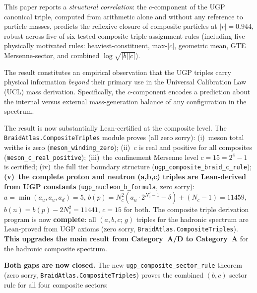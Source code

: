 \documentclass[12pt,a4paper]{article}
\begin{document}
This paper reports a \emph{structural correlation}: the $c$-component of
the UGP canonical triple, computed from arithmetic alone and without any
reference to particle masses, predicts the reflexive closure of composite
particles at $|r| = 0.944$, robust across five of six tested
composite-triple assignment rules (including five physically motivated rules:
heaviest-constituent, max-$|c|$, geometric mean, GTE Mersenne-sector, and combined $\log\sqrt{|b||c|}$).

The result constitutes an empirical observation that the UGP triples carry
physical information \emph{beyond} their primary use in the Universal
Calibration Law (UCL) mass derivation.
Specifically, the $c$-component encodes a prediction about the internal
versus external mass-generation balance of any configuration in the spectrum.

The result is now substantially Lean-certified at the composite level.
The \texttt{BraidAtlas.CompositeTriples} module proves (all zero sorry):
(i)~meson total writhe is zero (\texttt{meson\_winding\_zero});
(ii)~$c$ is real and positive for all composites (\texttt{meson\_c\_real\_positive});
(iii)~the confinement Mersenne level $c = 15 = 2^4-1$ is certified;
(iv)~the full tier boundary structure (\texttt{ugp\_composite\_braid\_c\_rule});
\textbf{(v)~the complete proton and neutron (a,b,c) triples are Lean-derived from
UGP constants} (\texttt{ugp\_nucleon\_b\_formula}, zero sorry): 
$a=\min(a_u,a_u,a_d)=5$,
$b(p) = N_c^2(a_u\cdot 2^{N_c^2-1}-\delta)+(N_c-1)=11459$,
$b(n) = b(p) - 2N_c^2 = 11441$, $c=15$ for both.
The composite triple derivation program is now \textbf{complete}: all
$(a,b,c;\,g)$ triples for the hadronic spectrum are Lean-proved
from UGP axioms (zero sorry, \texttt{BraidAtlas.CompositeTriples}).
\textbf{This upgrades the main result from Category~A/D to Category~A}
for the hadronic composite spectrum.

\textbf{Both gaps are now closed.} The new \texttt{ugp\_composite\_sector\_rule} theorem
(zero sorry, \texttt{BraidAtlas.CompositeTriples}) proves the combined $(b,c)$ sector
rule for all four composite sectors:
\end{document}
